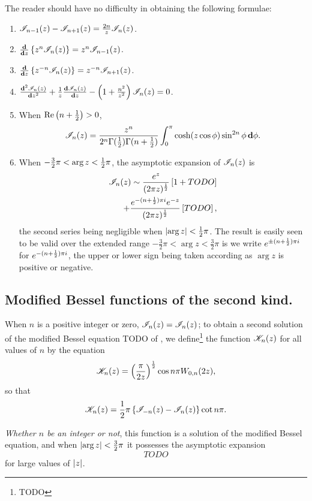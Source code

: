 \documentclass{book}
\begin{document}
The reader should have no difficulty in obtaining the following
formulae:
\begin{enumerate}
\item $\mathscr{I}_{n-1}(z) - \mathscr{I}_{n+1}(z) = \frac{2n}{z} \mathscr{I}_n(z)$.
\item $\frac{\mathbf{d}}{\mathbf{d} z} \left\{ z^n \mathscr{I}_n(z) \right\} = z^n \mathscr{I}_{n-1}(z)$.
\item $\frac{\mathbf{d}}{\mathbf{d} z} \left\{ z^{-n} \mathscr{I}_n(z) \right\} = z^{-n} \mathscr{I}_{n+1}(z)$.
\item $\frac{\mathbf{d}^2 \mathscr{I}_n(z)}{\mathbf{d} z^2} + \frac{1}{z} \frac{\mathbf{d}
    \mathscr{I}_n(z)}{\mathbf{d} z} -
  \left( 1 + \frac{n^2}{z^2} \right) \mathscr{I}_n(z) = 0$.
\item When $\mathrm{Re} \left( n + \frac{1}{2} \right) > 0$,
  $$
  \mathscr{I}_n(z)
  =
  \frac{z^n}{2^n \Gamma(\frac{1}{2}) \Gamma(n+\frac{1}{2})}
  \int_0^{\pi}
  \cosh (z\cos\phi) \sin^{2n} \phi \, \mathbf{d} \phi.
  $$
\item When $-\frac{3}{2}\pi < \arg z < \frac{1}{2} \pi$, the asymptotic
  expansion of $\mathscr{I}_n(z)$ is
  \begin{align*}
    \mathscr{I}_n(z)
    \sim
    \frac{ e^z}{ (2\pi z)^{\frac{1}{2}}}
    \left[ 1 + TODO \right]
    \\
    +
    \frac{ e^{-(n+\frac{1}{2}) \pi i} e^{-z}}{ (2\pi z)^{\frac{1}{2}} }
    \left[ TODO \right],
  \end{align*}
  the second series being negligible when $\left| \arg z \right| < \frac{1}{2}
  \pi$. The result is easily seen to be valid over the extended
  range $-\frac{3}{2} \pi < \arg z < \frac{3}{2} \pi$ is we write
  $e^{\pm (n+\frac{1}{2})\pi i}$ for $e^{-(n+\frac{1}{2})\pi i}$, the upper or
  lower sign being taken according as $\arg z$ is positive or negative.
\end{enumerate}

\subsection{Modified Bessel functions of the second kind.}
When $n$ is a positive integer or zero, $\mathscr{I}_n(z) = \mathscr{I}_n(z)$;
to obtain a second solution of the modified Bessel equation TODO
of , we define\footnote{TODO} the function
$\mathscr{K}_n(z)$ for all values of $n$ by the equation
$$
\mathscr{K}_n(z)
=
\left( \frac{\pi}{2z} \right)^{\frac{1}{2}}
\cos n\pi
W_{0,n}(2z),
$$
so that
$$
\mathscr{K}_n(z) = \frac{1}{2} \pi \left\{ \mathscr{I}_{-n}(z) - \mathscr{I}_n(z) \right\} \cot n\pi.
$$

% 
% 
\emph{Whether $n$ be an integer or not}, this function is a
solution of the modified Bessel equation, and when
$\left| \arg z \right| < \frac{3}{2} \pi$ it possesses the asymptotic
expansion
$$
TODO
$$
for large values of $\left| z \right|$.
\end{document}
